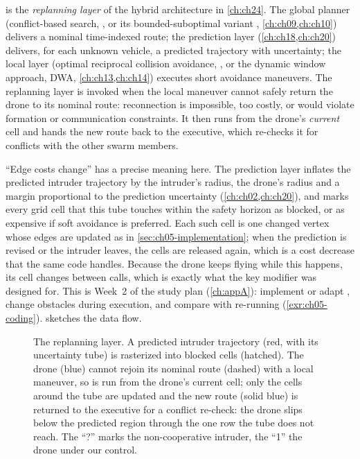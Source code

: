 \begin{dronebox}
\dstarlite is the \emph{replanning layer} of the hybrid architecture in \cref{ch:ch24}.
The global planner (conflict-based search, \cbs, or its bounded-suboptimal variant
\ecbs, \cref{ch:ch09,ch:ch10}) delivers a nominal
time-indexed route; the prediction layer (\cref{ch:ch18,ch:ch20}) delivers, for each
unknown vehicle, a predicted trajectory with uncertainty; the local layer (optimal
reciprocal collision avoidance, \orca, or the dynamic window approach, DWA,
\cref{ch:ch13,ch:ch14}) executes short avoidance maneuvers. The replanning layer is
invoked when the local maneuver cannot safely return the drone to its nominal route:
reconnection is impossible, too costly, or would violate formation or communication
constraints. It then runs \DslComputeShortestPath from the drone's \emph{current} cell
and hands the new route back to the executive, which re-checks it for conflicts with
the other swarm members.

``Edge costs change'' has a precise meaning here. The prediction layer inflates the
predicted intruder trajectory by the intruder's radius, the drone's radius and a
margin proportional to the prediction uncertainty (\cref{ch:ch02,ch:ch20}), and marks
every grid cell that this tube touches within the safety horizon as blocked, or as
expensive if soft avoidance is preferred. Each such cell is one changed vertex whose
edges are updated as in \cref{sec:ch05-implementation}; when the prediction is revised
or the intruder leaves, the cells are released again, which is a cost decrease that the
same code handles. Because the drone keeps flying while this happens, its cell changes
between calls, which is exactly what the key modifier was designed for. This is
Week~2 of the study plan (\cref{ch:appA}): implement or adapt \dstarlite, change
obstacles during execution, and compare with re-running \astar
(\cref{exr:ch05-coding}).  sketches the data flow.
\end{dronebox}

\begin{figure}[tb]
  \centering
  \caption{The replanning layer. A predicted intruder trajectory (red, with its
  uncertainty tube) is rasterized into blocked cells (hatched). The drone (blue) cannot
  rejoin its nominal route (dashed) with a local maneuver, so \dstarlite is run from
  the drone's current cell; only the cells around the tube are updated and the new
  route (solid blue) is returned to the executive for a conflict re-check: the drone
  slips below the predicted region through the one row the tube does not reach. The
  ``?'' marks the non-cooperative intruder, the ``1'' the drone under our control.}
  \label{fig:ch05-drone}
\end{figure}


